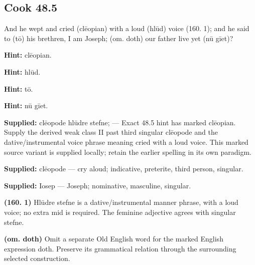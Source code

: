 \par\begin{minipage}{\linewidth}\raggedright
\subsection*{Cook 48.5}

And he wept and cried (clēopian) with a loud (hlūd) voice (160. 1); and he said to (tō) his brethren, I am Joseph; (om. doth) our father live yet (nū gīet)?

\textbf{Hint:} clēopian.

\textbf{Hint:} hlūd.

\textbf{Hint:} tō.

\textbf{Hint:} nū gīet.

\end{minipage}\par\addvspace{4pt}

\textbf{Supplied:} clēopode hlūdre stefne; — Exact 48.5 hint has marked clēopian. Supply the derived weak class II past third singular clēopode and the dative/\allowbreak{}instrumental voice phrase meaning cried with a loud voice. This marked source variant is supplied locally; retain the earlier spelling in its own paradigm.

\textbf{Supplied:} clēopode — cry aloud; indicative, preterite, third person, singular.

\textbf{Supplied:} Iosep — Joseph; nominative, masculine, singular.

\textbf{(160. 1)} Hlūdre stefne is a dative/\allowbreak{}instrumental manner phrase, with a loud voice; no extra mid is required. The feminine adjective agrees with singular stefne.

\textbf{(om. doth)} Omit a separate Old English word for the marked English expression doth. Preserve its grammatical relation through the surrounding selected construction.

